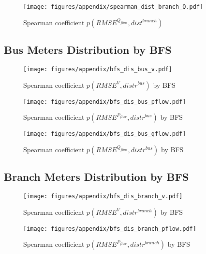 \begin{appendices}
    \begin{figure}[!htb]
        \centering
        \texttt{[image: figures/appendix/spearman\_dist\_branch\_Q.pdf]}
        \caption{Spearman coefficient $p(RMSE^{Q_{flow}},dist^{branch})$}
    \end{figure}
\FloatBarrier


\subsection{Bus Meters Distribution by BFS}

    \begin{figure}[!htb]
        \centering
        \texttt{[image: figures/appendix/bfs\_dis\_bus\_v.pdf]}
        \caption{Spearman coefficient $p(RMSE^V,distr^{bus})$ by BFS}
        \label{fig:app_db_bus_v}
    \end{figure}
    
    \begin{figure}[!htb]
        \centering
        \texttt{[image: figures/appendix/bfs\_dis\_bus\_pflow.pdf]}
        \caption{Spearman coefficient $p(RMSE^{P_{flow}},distr^{bus})$ by BFS}
        \label{fig:app_db_bus_pflow}
    \end{figure}
    
    \begin{figure}[!htb]
        \centering
        \texttt{[image: figures/appendix/bfs\_dis\_bus\_qflow.pdf]}
        \caption{Spearman coefficient $p(RMSE^{Q_{flow}},distr^{bus})$ by BFS}
        \label{fig:app_db_bus_qflow}
    \end{figure}
\FloatBarrier

\subsection{Branch Meters Distribution by BFS}
    
    \begin{figure}[!htb]
        \centering
        \texttt{[image: figures/appendix/bfs\_dis\_branch\_v.pdf]}
        \caption{Spearman coefficient $p(RMSE^V,distr^{branch})$ by BFS}
        \label{fig:app_db_branch_v}
    \end{figure}
    
    \begin{figure}[!htb]
        \centering
        \texttt{[image: figures/appendix/bfs\_dis\_branch\_pflow.pdf]}
        \caption{Spearman coefficient $p(RMSE^{P_{flow}},distr^{branch})$ by BFS}
        \label{fig:app_db_branch_pflow}
    \end{figure}
    

\end{appendices}
